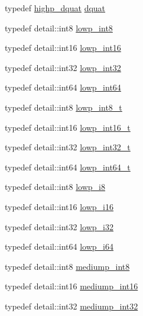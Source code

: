 \begin{DoxyCompactItemize}
\item 
typedef \hyperlink{namespaceglm_a6504747f6a2ec4a369a51244fcabc61e}{highp\-\_\-dquat} \hyperlink{namespaceglm_a49693161673a003b4a8fd4d8b15b0b7b}{dquat}
\item 
typedef detail\-::int8 \hyperlink{group__gtc__type__precision_gaf9e675b6392764242ae87eb179e9d3d6}{lowp\-\_\-int8}
\item 
typedef detail\-::int16 \hyperlink{group__gtc__type__precision_ga71fc0c399fa4780507748b643733f153}{lowp\-\_\-int16}
\item 
typedef detail\-::int32 \hyperlink{group__gtc__type__precision_gad9939c9d6fec1c6accc02a83c6500f08}{lowp\-\_\-int32}
\item 
typedef detail\-::int64 \hyperlink{group__gtc__type__precision_gab8a8e75af347592406e41b3ae2c0712b}{lowp\-\_\-int64}
\item 
typedef detail\-::int8 \hyperlink{group__gtc__type__precision_gae6092311f6970a305c2df19a372360a3}{lowp\-\_\-int8\-\_\-t}
\item 
typedef detail\-::int16 \hyperlink{group__gtc__type__precision_gae34c3d53c4c1434fc9f26538b0185667}{lowp\-\_\-int16\-\_\-t}
\item 
typedef detail\-::int32 \hyperlink{group__gtc__type__precision_gad9567c806dc39f534174eef42663119d}{lowp\-\_\-int32\-\_\-t}
\item 
typedef detail\-::int64 \hyperlink{group__gtc__type__precision_ga14d72e76d57c7f28eca8e933816c9fd6}{lowp\-\_\-int64\-\_\-t}
\item 
typedef detail\-::int8 \hyperlink{group__gtc__type__precision_gaa2e13ee29c90f75658beed6082541097}{lowp\-\_\-i8}
\item 
typedef detail\-::int16 \hyperlink{group__gtc__type__precision_gaf7bbfd31bcec25a416ea94d09efb5451}{lowp\-\_\-i16}
\item 
typedef detail\-::int32 \hyperlink{group__gtc__type__precision_ga70fd34e8b8cffc92739161284ed77328}{lowp\-\_\-i32}
\item 
typedef detail\-::int64 \hyperlink{group__gtc__type__precision_ga1f4ded25f71c0f3b4518936d50b54b6e}{lowp\-\_\-i64}
\item 
typedef detail\-::int8 \hyperlink{group__gtc__type__precision_ga3ee8faab2278c44c5785af04b7b18a14}{mediump\-\_\-int8}
\item 
typedef detail\-::int16 \hyperlink{group__gtc__type__precision_ga4611997edb6c61606daa11990cf08798}{mediump\-\_\-int16}
\item 
typedef detail\-::int32 \hyperlink{group__gtc__type__precision_ga0660a752402702f420f13c686a7fff29}{mediump\-\_\-int32}

\end{DoxyCompactItemize}
